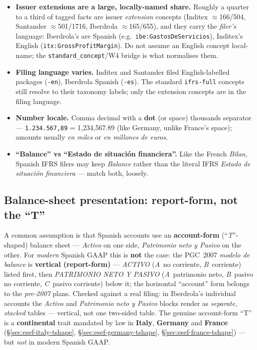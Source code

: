 \documentclass[11pt,a4paper]{report}
\begin{document}
\begin{itemize}
  \item \textbf{Issuer extensions are a large, locally-named share.} Roughly a quarter to a third of tagged
    facts are issuer \emph{extension} concepts (Inditex \(\approx\)166/504, Santander \(\approx\)501/1716,
    Iberdrola \(\approx\)165/655), and they carry the \emph{filer's} language: Iberdrola's are Spanish
    (e.g.\ \texttt{ibe:GastosDeServicios}), Inditex's English (\texttt{itx:GrossProfitMargin}). Do not assume
    an English concept local-name; the \texttt{standard\_concept}/W4 bridge is what normalises them.
  \item \textbf{Filing language varies.} Inditex and Santander filed English-labelled packages (\texttt{-en}),
    Iberdrola Spanish (\texttt{-es}). The standard \texttt{ifrs-full} concepts still resolve to their taxonomy
    labels; only the extension concepts are in the filing language.
  \item \textbf{Number locale.} Comma decimal with a \textbf{dot} (or space) thousands separator ---
    \texttt{1.234.567,89} = 1{,}234{,}567.89 (like Germany, unlike France's space); amounts usually
    \emph{en miles} or \emph{en millones de euros}.
  \item \textbf{``Balance'' vs ``Estado de situación financiera''.} Like the French \emph{Bilan}, Spanish IFRS
    filers may keep \emph{Balance} rather than the literal IFRS \emph{Estado de situación financiera} --- match
    both, loosely.
\end{itemize}

\subsection{Balance-sheet presentation: report-form, not the ``T''}
\label{sec:esef-spain-tshape}

A common assumption is that Spanish accounts use an \textbf{account-form} (``\emph{T}''-shaped) balance sheet
--- \emph{Activo} on one side, \emph{Patrimonio neto y Pasivo} on the other. For \emph{modern} Spanish GAAP
this is \textbf{not} the case: the PGC~2007 \emph{modelo de balance} is \textbf{vertical (report-form)} ---
\emph{ACTIVO} (\emph{A}~no corriente, \emph{B}~corriente) listed first, then \emph{PATRIMONIO NETO Y PASIVO}
(\emph{A}~patrimonio neto, \emph{B}~pasivo no corriente, \emph{C}~pasivo corriente) below it; the horizontal
``account'' form belongs to the \emph{pre-2007} plans. Checked against a real filing: in Iberdrola's
individual accounts the \emph{Activo} and \emph{Patrimonio neto y Pasivo} blocks render as \emph{separate,
stacked} tables --- vertical, not one two-sided table. The genuine account-form ``T'' is a \textbf{continental}
trait mandated by law in \textbf{Italy}, \textbf{Germany} and \textbf{France}
(\S\ref{sec:esef-italy-tshape}, \S\ref{sec:esef-germany-tshape}, \S\ref{sec:esef-france-tshape}) --- but
\emph{not} in modern Spanish GAAP.
\end{document}
